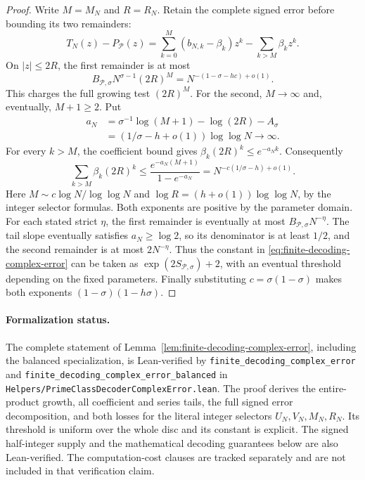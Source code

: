 \documentclass[11pt]{article}
\theoremstyle{definition}
\begin{document}
\begin{proof}
Write $M=M_N$ and $R=R_N$.
Retain the complete signed error before bounding its two remainders:
\begin{equation}
 T_N(z)-P_{\mathcal P}(z)
       =\sum_{k=0}^M(b_{N,k}-\beta_k)z^k
                              -\sum_{k>M}\beta_kz^k .
 \label{eq:finite-decoding-complete-error}
\end{equation}
On $|z|\le2R$, the first remainder is at most
\[
 B_{\mathcal P,\sigma}N^{\sigma-1}(2R)^M
                  =N^{-(1-\sigma-hc)+o(1)} .
\]
This charges the full growing test $(2R)^M$.
For the second, $M\to\infty$ and, eventually, $M+1\ge2$.
Put
\[
 \begin{aligned}
 a_N&=\sigma^{-1}\log(M+1)-\log(2R)-A_\sigma\\
    &=(1/\sigma-h+o(1))\log\log N\longrightarrow\infty .
 \end{aligned}
\]
For every $k>M$, the coefficient bound gives
$\beta_k(2R)^k\le e^{-a_Nk}$.
Consequently
\[
 \sum_{k>M}\beta_k(2R)^k
       \le\frac{e^{-a_N(M+1)}}{1-e^{-a_N}}
       =N^{-c(1/\sigma-h)+o(1)} .
\]
Here $M\sim c\log N/\log\log N$ and
$\log R=(h+o(1))\log\log N$, by the integer selector formulas.
Both exponents are positive by the parameter domain.
For each stated strict $\eta$, the first remainder is eventually at most
$B_{\mathcal P,\sigma}N^{-\eta}$.
The tail slope eventually satisfies $a_N\ge\log2$, so its denominator
is at least $1/2$, and the second remainder is at most $2N^{-\eta}$.
Thus the constant in \eqref{eq:finite-decoding-complex-error} can be taken as
$\exp(2S_{\mathcal P,\sigma})+2$, with an eventual threshold depending
on the fixed parameters.
Finally substituting $c=\sigma(1-\sigma)$ makes both
exponents $(1-\sigma)(1-h\sigma)$.
\end{proof}

\paragraph{Formalization status.}
The complete statement of Lemma~\ref{lem:finite-decoding-complex-error},
including the balanced specialization, is Lean-verified by
\texttt{finite\_\allowbreak decoding\_\allowbreak complex\_\allowbreak error} and
\texttt{finite\_\allowbreak decoding\_\allowbreak complex\_\allowbreak error\_\allowbreak balanced} in
\texttt{Helpers/}\allowbreak\texttt{PrimeClassDecoderComplexError.lean}.
The proof derives the entire-product growth, all coefficient and series
tails, the full signed error decomposition, and both losses for the
literal integer selectors $U_N,V_N,M_N,R_N$.
Its threshold is uniform over the whole disc and its constant is explicit.
The signed half-integer supply and the mathematical decoding guarantees
below are also Lean-verified. The computation-cost clauses are tracked
separately and are not included in that verification claim.
\end{document}
